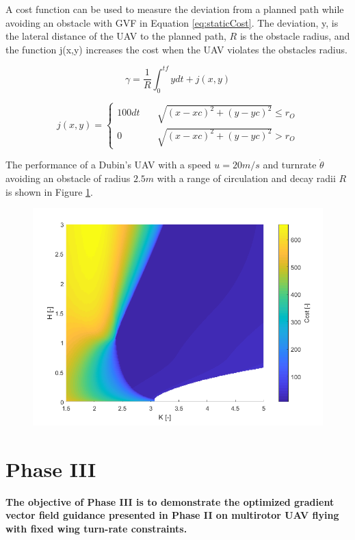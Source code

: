 \documentclass[numbered,pdftex]{ohio-etd}
\begin{document}
A cost function can be used to measure the deviation from a planned path while avoiding an obstacle with GVF in Equation \ref{eq:staticCost}. The deviation, y, is the lateral distance of the UAV to the planned path, $R$ is the obstacle radius, and the function j(x,y) increases the cost when the UAV violates the obstacles radius.

\begin{equation}
\label{eq:staticCost}
\gamma = \frac{1}{R}\int_{0}^{tf}ydt + j(x,y) 
\end{equation}


\begin{equation}
j(x,y) = \left\{
\begin{array}{ll}
100dt & \quad \sqrt{(x-xc)^2+(y-yc)^2} \leq r_O \\
0 & \quad \sqrt{ (x-xc)^2+(y-yc)^2 } > r_O
\end{array}
\right.
\end{equation}

The performance of a Dubin's UAV with a speed $u=20m/s$ and turnrate $\dot{\theta}$ avoiding an obstacle of radius $2.5m$ with a range of circulation and decay radii $R$ is shown in Figure \ref{fig:costHandR}. 


\begin{figure}[H]
	\centering
	\includegraphics[trim=0 0 0 0,clip,width=16cm]{PaperFigures/Methods/costHandR}
	\caption{}
	\label{fig:costHandR}
\end{figure}


\section{Phase III}
\textbf{The objective of Phase III is to demonstrate the optimized gradient vector field guidance presented in Phase II on multirotor UAV flying with fixed wing turn-rate constraints.}
\end{document}
